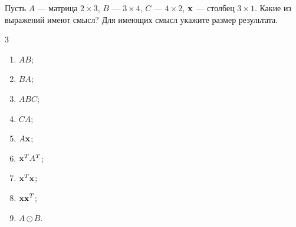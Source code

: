 \begin{exercise}
Пусть $A$ --- матрица $2\times3$, $B$ --- $3\times4$, $C$ --- $4\times2$, $\mathbf{x}$ --- столбец $3\times1$. Какие из выражений имеют смысл? Для имеющих смысл укажите размер результата.
\begin{multicols}{3}
\begin{enumerate}[label=\asbuk*)]
  \item $AB$;
  \item $BA$;
  \item $ABC$;
  \item $CA$;
  \item $A\mathbf{x}$;
  \item $\mathbf{x}^TA^T$;
  \item $\mathbf{x}^T\mathbf{x}$;
  \item $\mathbf{x}\mathbf{x}^T$;
  \item $A\odot B$.
\end{enumerate}
\end{multicols}
\end{exercise}

